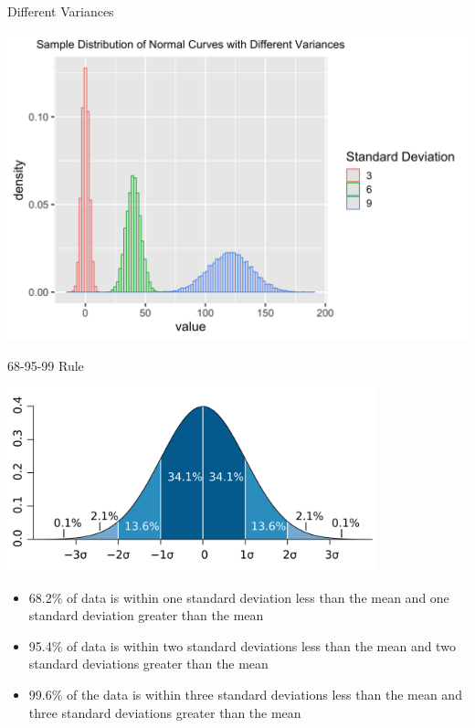 \documentclass{beamer}
\begin{document}
\begin{frame}{Different Variances}
    \begin{center}
        \includegraphics[width=\textwidth]{normdist_multiplevars.png}
    \end{center}
\end{frame}

\begin{frame}{68-95-99 Rule}
    \begin{center}
        \includegraphics[width=0.8\textwidth]{stddevnorm}
    \end{center}
	
	\footnotesize{
		\begin{itemize}
			\item 68.2\% of data is within one standard deviation less than the mean and one standard deviation greater than the mean
			\item 95.4\% of data is within two standard deviations less than the mean and two standard deviations greater than the mean
			\item 99.6\% of the data is within three standard deviations less than the mean and three standard deviations greater than the mean
		\end{itemize}}
\end{frame}
\end{document}
